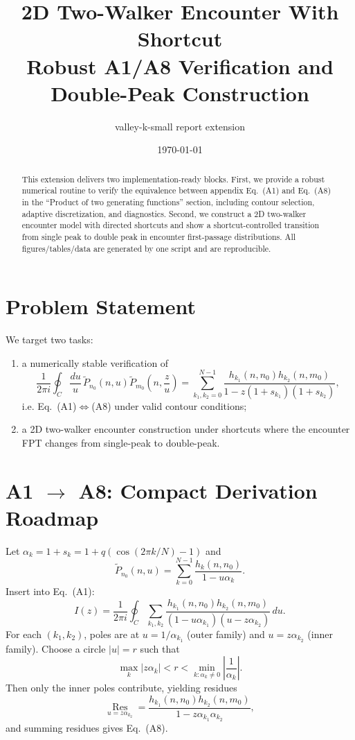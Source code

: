 \documentclass[11pt]{article}
\title{2D Two-Walker Encounter With Shortcut\\\large Robust A1/A8 Verification and Double-Peak Construction}
\author{valley-k-small report extension}
\date{\today}
\begin{document}
\maketitle

\begin{abstract}
This extension delivers two implementation-ready blocks.
First, we provide a robust numerical routine to verify the equivalence between appendix Eq.~(A1) and Eq.~(A8) in the ``Product of two generating functions'' section, including contour selection, adaptive discretization, and diagnostics.
Second, we construct a 2D two-walker encounter model with directed shortcuts and show a shortcut-controlled transition from single peak to double peak in encounter first-passage distributions.
All figures/tables/data are generated by one script and are reproducible.
\end{abstract}

\section{Problem Statement}
We target two tasks:
\begin{enumerate}[leftmargin=1.4em]
  \item a numerically stable verification of
  \[
  \frac{1}{2\pi i}\oint_C\frac{du}{u}\,\widetilde P_{n_0}(n,u)\widetilde P_{m_0}\!\left(n,\frac{z}{u}\right)
  =
  \sum_{k_1,k_2=0}^{N-1}\frac{h_{k_1}(n,n_0)h_{k_2}(n,m_0)}{1-z(1+s_{k_1})(1+s_{k_2})},
  \]
  i.e. Eq.~(A1)$\Leftrightarrow$(A8) under valid contour conditions;
  \item a 2D two-walker encounter construction under shortcuts where the encounter FPT changes from single-peak to double-peak.
\end{enumerate}

\section{A1 $\rightarrow$ A8: Compact Derivation Roadmap}
Let $\alpha_k=1+s_k=1+q(\cos(2\pi k/N)-1)$ and
\[
\widetilde P_{n_0}(n,u)=\sum_{k=0}^{N-1}\frac{h_k(n,n_0)}{1-u\alpha_k}.
\]
Insert into Eq.~(A1):
\[
I(z)=\frac{1}{2\pi i}\oint_C\sum_{k_1,k_2}
\frac{h_{k_1}(n,n_0)h_{k_2}(n,m_0)}{(1-u\alpha_{k_1})(u-z\alpha_{k_2})}\,du.
\]
For each $(k_1,k_2)$, poles are at $u=1/\alpha_{k_1}$ (outer family) and $u=z\alpha_{k_2}$ (inner family).
Choose a circle $|u|=r$ such that
\[
\max_k|z\alpha_k|<r<\min_{k:\alpha_k\neq 0}\left|\frac{1}{\alpha_k}\right|.
\]
Then only the inner poles contribute, yielding residues
\[
\operatorname*{Res}_{u=z\alpha_{k_2}}=
\frac{h_{k_1}(n,n_0)h_{k_2}(n,m_0)}{1-z\alpha_{k_1}\alpha_{k_2}},
\]
and summing residues gives Eq.~(A8).
\end{document}
